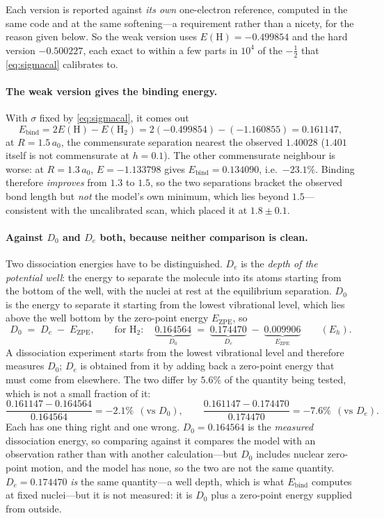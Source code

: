 \documentclass[11pt,a4paper]{article}
\begin{document}
Each version is reported against \emph{its own} one-electron reference, computed in the same code
and at the same softening---a requirement rather than a nicety, for the reason given below. So the
weak version uses $E(\mathrm{H}) = -0.499854$ and the hard version $-0.500227$, each exact to within
a few parts in $10^4$ of the $-\tfrac12$ that \eqref{eq:sigmacal} calibrates to.

\paragraph{The weak version gives the binding energy.} With $\sigma$ fixed by
\eqref{eq:sigmacal}, it comes out
\[
  E_{\text{bind}} = 2E(\mathrm{H}) - E(\mathrm{H_2}) = 2(-0.499854) - (-1.160855) = 0.161147 ,
\]
at $R = 1.5\,a_0$, the commensurate separation nearest the observed $1.40028$ ($1.401$ itself is not
commensurate at $h = 0.1$). The other commensurate neighbour is worse: at $R = 1.3\,a_0$,
$E = -1.133798$ gives $E_{\text{bind}} = 0.134090$, i.e.\ $-23.1\%$. Binding therefore
\emph{improves} from $1.3$ to $1.5$, so the two separations bracket the observed bond length but
\emph{not} the model's own minimum, which lies beyond $1.5$---consistent with the uncalibrated scan,
which placed it at $1.8\pm0.1$.

\paragraph{Against $D_0$ and $D_e$ both, because neither comparison is clean.} Two dissociation
energies have to be distinguished. $D_e$ is the \emph{depth of the potential well}: the energy to
separate the molecule into its atoms starting from the bottom of the well, with the nuclei at rest
at the equilibrium separation. $D_0$ is the energy to separate it starting from the lowest
vibrational level, which lies above the well bottom by the zero-point energy $E_{\text{ZPE}}$, so
\begin{equation}
  D_0 \;=\; D_e \;-\; E_{\text{ZPE}} ,
  \qquad \text{for H}_2 : \quad
  \underbrace{0.164564}_{D_0} \;=\; \underbrace{0.174470}_{D_e} \;-\; \underbrace{0.009906}_{E_{\text{ZPE}}}
  \qquad (E_h) .
  \label{eq:d0de}
\end{equation}
A dissociation experiment starts from the lowest vibrational level and therefore measures $D_0$;
$D_e$ is obtained from it by adding back a zero-point energy that must come from elsewhere. The two
differ by $5.6\%$ of the quantity being tested, which is not a small fraction of it:
\[
  \frac{0.161147 - 0.164564}{0.164564} = \mathbf{-2.1\%} \ \ (\text{vs } D_0) ,
  \qquad
  \frac{0.161147 - 0.174470}{0.174470} = \mathbf{-7.6\%} \ \ (\text{vs } D_e) .
\]
Each has one thing right and one wrong. $D_0 = 0.164564$ is the \emph{measured} dissociation
energy, so comparing against it compares the model with an observation rather than with another
calculation---but $D_0$ includes nuclear zero-point motion, and the model has none, so the two are
not the same quantity. $D_e = 0.174470$ \emph{is} the same quantity---a well depth, which is what
$E_{\text{bind}}$ computes at fixed nuclei---but it is not measured: it is $D_0$ plus a zero-point
energy supplied from outside.
\end{document}
